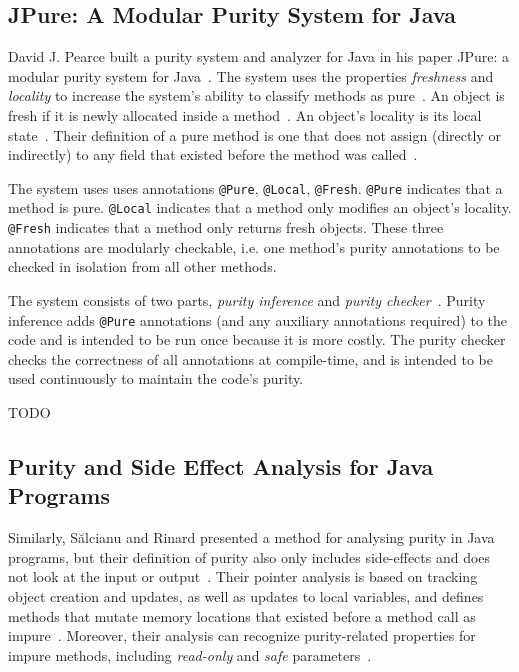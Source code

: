 \documentclass[a4paper,12pt]{article}
\begin{document}
\subsection{JPure: A Modular Purity System for Java} \label{sub:JPure: A Modular Purity System for Java}
David J. Pearce built a purity system and analyzer for Java in his paper JPure: a modular purity system for Java~\cite{pearce2011jpure}. The system uses the properties \textit{freshness} and \textit{locality} to increase the system's ability to classify methods as pure~\cite{pearce2011jpure}. An object is fresh if it is newly allocated inside a method~\cite{pearce2011jpure}. An object's locality is its local state~\cite{pearce2011jpure}. Their definition of a pure method is one that does not assign (directly or indirectly) to any field that existed before the method was called~\cite{pearce2011jpure}.

The system uses uses annotations \texttt{@Pure}, \texttt{@Local}, \texttt{@Fresh}. \texttt{@Pure} indicates that a method is pure. \texttt{@Local} indicates that a method only modifies an object's locality. \texttt{@Fresh} indicates that a method only returns fresh objects. These three annotations are modularly checkable, i.e. one method's purity annotations to be checked in isolation from all other methods.

The system consists of two parts, \textit{purity inference} and \textit{purity checker}~\cite{pearce2011jpure}. Purity inference adds \texttt{@Pure} annotations (and any auxiliary annotations required) to the code and is intended to be run once because it is more costly. The purity checker checks the correctness of all annotations at compile-time, and is intended to be used continuously to maintain the code's purity.

TODO

\subsection{Purity and Side Effect Analysis for Java Programs} \label{sub:Purity and Side Effect Analysis for Java Programs}
Similarly, S\u{a}lcianu and Rinard presented a method for analysing purity in Java programs, but their definition of purity also only includes side-effects and does not look at the input or output~\cite{salcianu}. Their pointer analysis is based on tracking object creation and updates, as well as updates to local variables, and defines methods that mutate memory locations that existed before a method call as impure~\cite{salcianu}. Moreover, their analysis can recognize purity-related properties for impure methods, including \textit{read-only} and \textit{safe} parameters~\cite{salcianu}.
\end{document}
